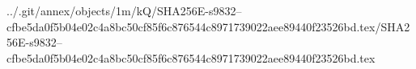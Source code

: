 ../.git/annex/objects/1m/kQ/SHA256E-s9832--cfbe5da0f5b04e02c4a8bc50cf85f6c876544c8971739022aee89440f23526bd.tex/SHA256E-s9832--cfbe5da0f5b04e02c4a8bc50cf85f6c876544c8971739022aee89440f23526bd.tex